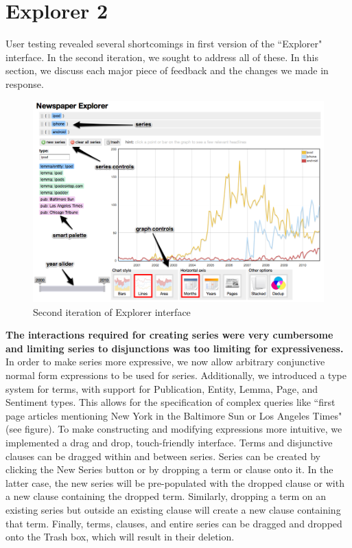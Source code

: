 \section{Explorer 2}
User testing revealed several shortcomings in first version of the ``Explorer" interface. In the second iteration, we sought to address all of these. In this section, we discuss each major piece of feedback and the changes we made in response.

\begin{figure}[htb]
  \centerline{
    \includegraphics[scale=0.28]{figures/explorer-ui.png}
  }
  \caption{Second iteration of Explorer interface}
  \label{fig:explorer-ui}
\end{figure}

\textbf{The interactions required for creating series were very cumbersome and limiting series to disjunctions was too limiting for expressiveness.} In order to make series more expressive, we now allow arbitrary conjunctive normal form expressions to be used for series. Additionally, we introduced a type system for terms, with support for Publication, Entity, Lemma, Page, and Sentiment types. This allows for the specification of complex queries like ``first page articles mentioning New York in the Baltimore Sun or Los Angeles Times" (see figure).
To make constructing and modifying expressions more intuitive, we implemented a drag and drop, touch-friendly interface. Terms and disjunctive clauses can be dragged within and between series. Series can be created by clicking the New Series button or by dropping a term or clause onto it. In the latter case, the new series will be pre-populated with the dropped clause or with a new clause containing the dropped term. Similarly, dropping a term on an existing series but outside an existing clause will create a new clause containing that term. Finally, terms, clauses, and entire series can be dragged and dropped onto the Trash box, which will result in their deletion. 

